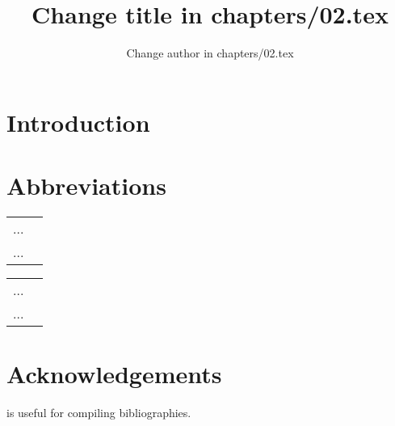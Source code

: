 \documentclass[output=paper]{langscibook}
\author{Change author in chapters/02.tex}
\title{Change title in chapters/02.tex}
\begin{document}
\maketitle

\section{Introduction}
 
 
\section*{Abbreviations}
\begin{tabularx}{.45\textwidth}{lQ}
... & \\
... & \\
\end{tabularx}
\begin{tabularx}{.45\textwidth}{lQ}
... & \\
... & \\
\end{tabularx}


\section*{Acknowledgements}
\citet{Nordhoff2018} is useful for compiling bibliographies.

\sloppy
\printbibliography[heading=subbibliography,notkeyword=this]
\end{document}
